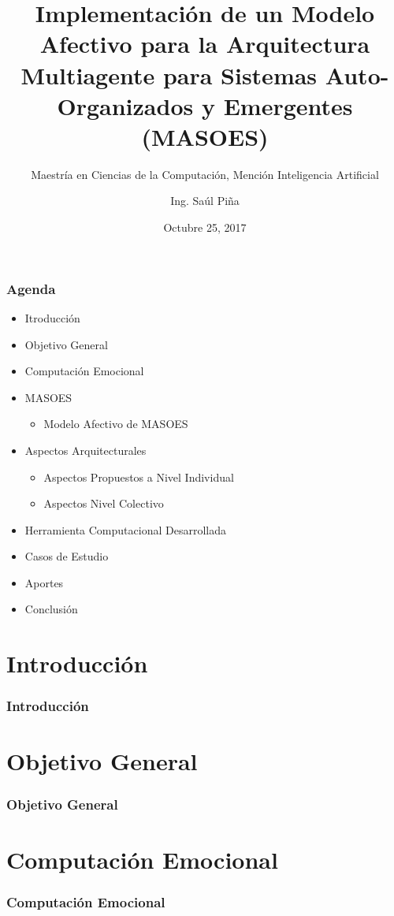 \documentclass{beamer}
\title{Implementación de un Modelo Afectivo para la Arquitectura Multiagente para Sistemas Auto-Organizados y Emergentes (MASOES)}
\subtitle{Maestría en Ciencias de la Computación, Mención Inteligencia Artificial}
\author{Ing. Saúl Piña}
\date{Octubre 25, 2017}
\institute{\url{sauljabin@gmail.com}}
\begin{document}
\begin{frame}[plain,t]
\titlepage
\end{frame}

\begin{frame}
\frametitle{Agenda}
\begin{itemize}
\item Itroducción
\item Objetivo General
\item Computación Emocional
\item MASOES
	\begin{itemize}
	\item Modelo Afectivo de MASOES
	\end{itemize}
\item Aspectos Arquitecturales
	\begin{itemize}
	\item Aspectos Propuestos a Nivel Individual
	\item Aspectos Nivel Colectivo
	\end{itemize}
\item Herramienta Computacional Desarrollada
\item Casos de Estudio
\item Aportes
\item Conclusión
\end{itemize}
\end{frame}

\section{Introducción}
\begin{frame}
\frametitle{Introducción}

\end{frame}

\section{Objetivo General}
\begin{frame}
\frametitle{Objetivo General}

\end{frame}

\section{Computación Emocional}
\begin{frame}
\frametitle{Computación Emocional}

\end{frame}
\end{document}
